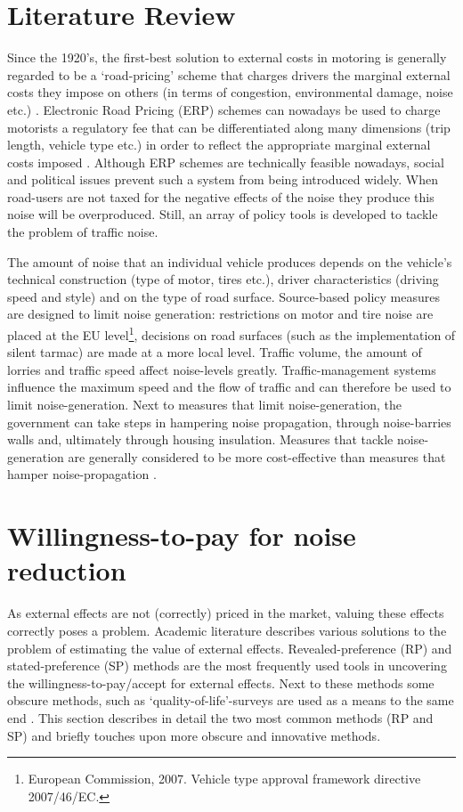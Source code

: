 \documentclass[a4paper]{scrartcl}
\begin{document}
\section{Literature Review}
Since the 1920’s, the first-best solution to external costs in motoring is generally regarded to be a ‘road-pricing’ scheme that charges drivers the marginal external costs they impose on others (in terms of congestion, environmental damage, noise etc.) \citep{Pigou1924}. Electronic Road Pricing (ERP) schemes can nowadays be used to charge motorists a regulatory fee that can be differentiated along many dimensions (trip length, vehicle type etc.) in order to reflect the appropriate marginal external costs imposed \citep{Verhoef1995}. Although ERP schemes are technically feasible nowadays, social and political issues prevent such a system from being introduced widely. When road-users are not taxed for the negative effects of the noise they produce this noise will be overproduced. Still, an array of policy tools is developed to tackle the problem of traffic noise.

The amount of  noise that an individual vehicle produces depends on the vehicle’s technical construction (type of motor, tires etc.), driver characteristics (driving speed and style) and on the type of road surface. Source-based policy measures are designed to limit noise generation: restrictions on motor and tire noise are placed at the EU level\footnote{European Commission, 2007.  Vehicle type approval framework directive 2007/46/EC.}, decisions on road surfaces (such as the implementation of silent tarmac) are made at a more local level. Traffic volume, the amount of lorries and traffic speed affect noise-levels greatly. Traffic-management systems influence the maximum speed and the flow of traffic and can therefore be used to limit noise-generation. Next to measures that limit noise-generation, the government can take steps in hampering noise propagation, through noise-barries walls and, ultimately through housing insulation.  Measures that tackle noise-generation are generally considered to be more cost-effective than measures that hamper noise-propagation \citep{DanishRoadInstituteDRI2005,DenBoer2007}.

\section{Willingness-to-pay for noise reduction}

As external effects are not (correctly) priced in the market, valuing these effects correctly poses a problem. Academic literature describes various solutions to the problem of estimating the value of external effects. Revealed-preference (RP) and stated-preference (SP) methods are the most frequently used tools in uncovering the willingness-to-pay/accept for external effects. Next to these methods some obscure methods, such as ‘quality-of-life’-surveys are used as a means to the same end \citep{VanPraag2001}. This section describes in detail the two most common methods (RP and SP) and briefly touches upon more obscure and innovative methods.
\end{document}
